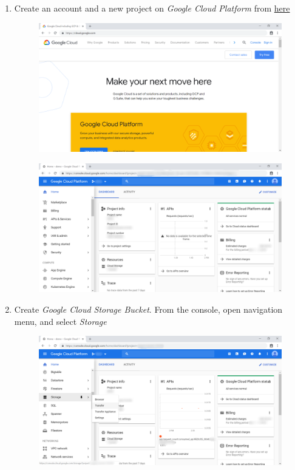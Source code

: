 \begin{enumerate}
	\item Create an account and a new project on \textit{Google Cloud Platform} from \href{https://cloud.google.com/}{here}
	      \begin{center}
	      	\begin{figure}[H]
	      		\centering
	      		\includegraphics[width=0.6\columnwidth]{images/appendixA/GCP-homepage.PNG}
	      	\end{figure}
	      \end{center}
	      \begin{center}
	      	\begin{figure}[H]
	      		\centering
	      		\includegraphics[width=0.6\columnwidth]{images/appendixA/GCP-console.PNG}
	      	\end{figure}
	      \end{center}
	\item Create \textit{Google Cloud Storage Bucket}. From the console, open navigation menu, and select \textit{Storage}
	      \begin{center}
	      	\begin{figure}[H]
	      		\centering
	      		\includegraphics[width=0.6\columnwidth]{images/appendixA/GCP-navigate-Storage.PNG}

\end{figure}
\end{center}
\end{enumerate}
